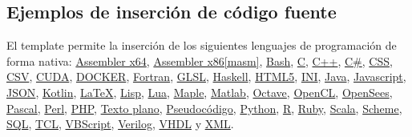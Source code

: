 		\lipsum[4]

		\begin{multicols}{2}

			\lipsum[4-5]
			
			
			\lipsum[6]
			
			
			
			\lipsum[1-2]

		\end{multicols}

	\subsection{Ejemplos de inserción de código fuente}

		\newcommand{\insertsrcmanual}[2]{\href{https://latex.ppizarror.com/informe.html?srctype=#1\#hlp-srccode}{#2}}

		El template permite la inserción de los siguientes lenguajes de programación de forma nativa: \insertsrcmanual{assemblerx64}{Assembler x64}, \insertsrcmanual{assemblerx86}{Assembler x86[masm]},  \insertsrcmanual{bash}{Bash}, \insertsrcmanual{c}{C}, \insertsrcmanual{cpp}{C++}, \insertsrcmanual{csharp}{C\#}, \insertsrcmanual{css}{CSS}, \insertsrcmanual{csv}{CSV}, \insertsrcmanual{cuda}{CUDA}, \insertsrcmanual{docker}{DOCKER}, \insertsrcmanual{fortran}{Fortran}, \insertsrcmanual{glsl}{GLSL}, \insertsrcmanual{haskell}{Haskell}, \insertsrcmanual{html5}{HTML5}, \insertsrcmanual{ini}{INI}, \insertsrcmanual{java}{Java}, \insertsrcmanual{js}{Javascript}, \insertsrcmanual{json}{JSON}, \insertsrcmanual{kotlin}{Kotlin}, \insertsrcmanual{latex}{LaTeX}, \insertsrcmanual{lisp}{Lisp}, \insertsrcmanual{lua}{Lua}, \insertsrcmanual{maple}{Maple}, \insertsrcmanual{matlab}{Matlab}, \insertsrcmanual{octave}{Octave}, \insertsrcmanual{opencl}{OpenCL}, \insertsrcmanual{opensees}{OpenSees}, \insertsrcmanual{pascal}{Pascal}, \insertsrcmanual{perl}{Perl}, \insertsrcmanual{php}{PHP}, \insertsrcmanual{plaintext}{Texto plano}, \insertsrcmanual{pseudocode}{Pseudocódigo}, \insertsrcmanual{python}{Python}, \insertsrcmanual{r}{R}, \insertsrcmanual{ruby}{Ruby}, \insertsrcmanual{scala}{Scala}, \insertsrcmanual{scheme}{Scheme}, \insertsrcmanual{sql}{SQL}, \insertsrcmanual{tcl}{TCL}, \insertsrcmanual{vbscript}{VBScript}, \insertsrcmanual{verilog}{Verilog}, \insertsrcmanual{vhdl}{VHDL} y \insertsrcmanual{xml}{XML}. \\
		
